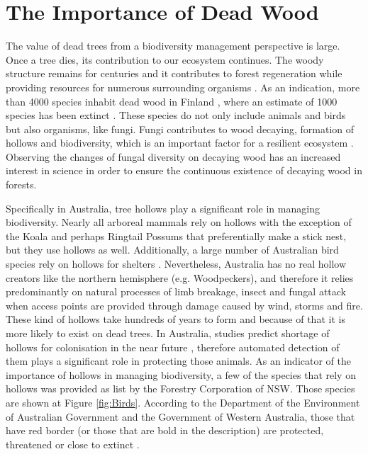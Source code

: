 \documentclass{subfiles}
\begin{document}
\section{The Importance of Dead Wood}

\par The value of dead trees from a biodiversity management perspective is large. Once a tree dies, its contribution to our ecosystem continues. The woody structure remains for centuries and it contributes to forest regeneration while providing resources for numerous surrounding organisms \cite{Franklin1987}. As an indication, more than 4000 species inhabit dead wood in Finland \cite{Siitonen2001}, where an estimate of 1000 species has been extinct \cite{Hanski2000}. These species do not only include animals and birds but also organisms, like fungi. Fungi contributes to wood decaying, formation of hollows and biodiversity, which is an important factor for a resilient ecosystem \cite{Peterson2000}. Observing the changes of fungal diversity on decaying wood has an increased interest in science  \cite{Abrego2011} \cite{Stokland2011} \cite{Lonsdale2008} in order to ensure the continuous existence of decaying wood in forests. 




\par Specifically in Australia, tree hollows play a significant role in managing biodiversity. Nearly all arboreal mammals rely on hollows with the exception of the Koala and perhaps Ringtail Possums that preferentially make a stick nest, but they use hollows as well. Additionally, a large number of Australian bird species rely on hollows for shelters \cite{Gibbons2002}. Nevertheless, Australia has no real hollow creators like the northern hemisphere (e.g. Woodpeckers), and therefore it relies predominantly on natural processes of limb breakage, insect and fungal attack when access points are provided through damage caused by wind, storms and fire. These kind of hollows take hundreds of years to form and because of that it is more likely to exist on dead trees. In Australia, studies predict shortage of hollows for colonisation in the near future \cite{Lindenmayer2010} \cite{Goldingay2009}, therefore automated detection of them plays a significant role in protecting those animals. As an indicator of the importance of hollows in managing biodiversity, a few of the species that rely on hollows was provided as list by the Forestry Corporation of NSW. Those species are shown at Figure \ref{fig:Birds}. According to the Department of the Environment of Australian Government and the Government of Western Australia, those that have red border (or those that are bold in the description) are protected, threatened or close to extinct \cite{AustraliaExtinct1999}  \cite{AustraliaExtince2015}. 
\end{document}
